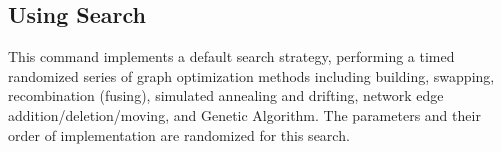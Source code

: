 \documentclass[11pt]{article}
\begin{document}
%
%
%
%
\subsection{Using Search}
\label{subsec:search}

This command implements a default search strategy, performing a timed randomized 
series of graph optimization methods including building, swapping, recombination 
(fusing), simulated annealing and drifting, network edge addition/deletion/moving, 
and Genetic Algorithm. The parameters and their order of implementation are 
randomized for this search.
\end{document}
